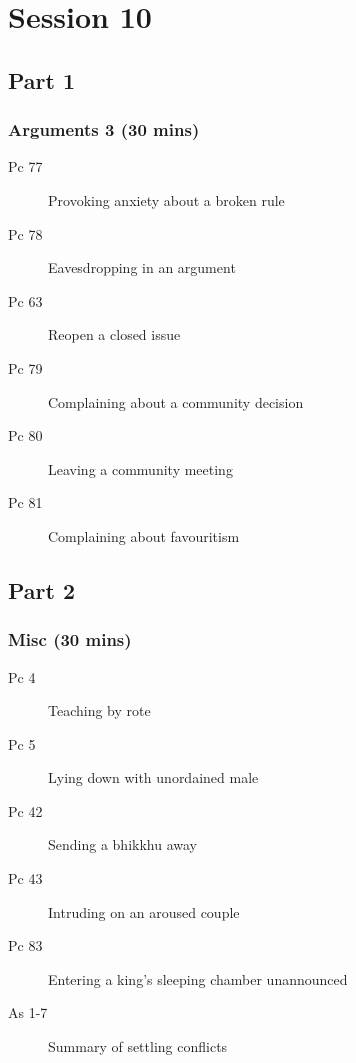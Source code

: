 \documentclass[11pt,oneside]{memoir}
\begin{document}
\chapter{Session 10}

\begin{multicols}{2}

\section{Part 1}

\subsection{Arguments 3 (30 mins)}

\begin{description}
\item[Pc 77] Provoking anxiety about a broken rule
\item[Pc 78] Eavesdropping in an argument
\item[Pc 63] Reopen a closed issue
\item[Pc 79] Complaining about a community decision
\item[Pc 80] Leaving a community meeting
\item[Pc 81] Complaining about favouritism
\end{description}

\columnbreak

\section{Part 2}

\subsection{Misc (30 mins)}

\begin{description}
\item[Pc 4] Teaching by rote
\item[Pc 5] Lying down with unordained male
\item[Pc 42] Sending a bhikkhu away
\item[Pc 43] Intruding on an aroused couple
\item[Pc 83] Entering a king's sleeping chamber unannounced
\item[As 1-7] Summary of settling conflicts
\end{description}

\end{multicols}
\end{document}

